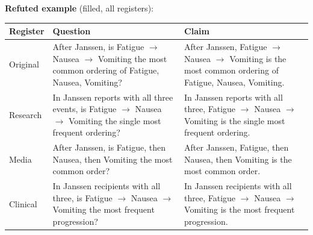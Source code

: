 \documentclass[11pt]{article}
\begin{document}
\vspace{3pt}
\textbf{Refuted example} (filled, all registers): \\
\begin{tabularx}{\linewidth}{@{}l L L@{}}
\toprule
\textbf{Register} & \textbf{Question} & \textbf{Claim} \\
\midrule
Original & After Janssen, is Fatigue $\rightarrow$  Nausea $\rightarrow$  Vomiting the most common ordering of Fatigue, Nausea, Vomiting? & After Janssen, Fatigue $\rightarrow$  Nausea $\rightarrow$  Vomiting is the most common ordering of Fatigue, Nausea, Vomiting. \\
Research & In Janssen reports with all three events, is Fatigue $\rightarrow$  Nausea $\rightarrow$  Vomiting the single most frequent ordering? & In Janssen reports with all three, Fatigue $\rightarrow$  Nausea $\rightarrow$  Vomiting is the single most frequent ordering. \\
Media & After Janssen, is Fatigue, then Nausea, then Vomiting the most common order? & After Janssen, Fatigue, then Nausea, then Vomiting is the most common order. \\
Clinical & In Janssen recipients with all three, is Fatigue $\rightarrow$  Nausea $\rightarrow$  Vomiting the most frequent progression? & In Janssen recipients with all three, Fatigue $\rightarrow$  Nausea $\rightarrow$  Vomiting is the most frequent progression. \\
\bottomrule
\end{tabularx}
\vspace{3pt}
\end{document}
